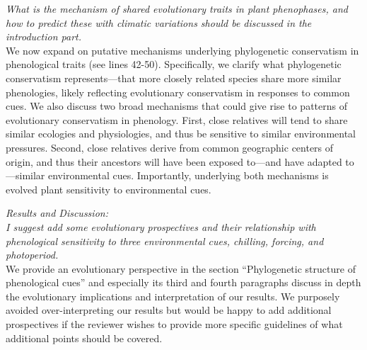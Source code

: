 \documentclass[11pt]{article}
\begin{document}
\emph{What is the mechanism of shared evolutionary traits in plant phenophases, and how to predict these with climatic variations should be discussed in the introduction part.}\\
We now expand on putative mechanisms underlying phylogenetic conservatism in phenological traits (see lines 42-50). Specifically, we clarify what phylogenetic conservatism represents---that more closely related species share more similar phenologies, likely reflecting evolutionary conservatism in responses to common cues. We also discuss two broad mechanisms that could give rise to patterns of evolutionary conservatism in phenology. First, close relatives will tend to share similar ecologies and physiologies, and thus be sensitive to similar environmental pressures. Second, close relatives derive from common geographic centers of origin, and thus their ancestors will have been exposed to---and have adapted to---similar environmental cues. Importantly, underlying both mechanisms is evolved plant sensitivity to environmental cues.


\emph{Results and Discussion:}\\
\emph{I suggest add some evolutionary prospectives and their relationship with phenological sensitivity to three environmental cues, chilling, forcing, and photoperiod.}\\
We provide an evolutionary perspective in the section ``Phylogenetic structure of phenological cues'' and especially its third and fourth paragraphs discuss in depth the evolutionary implications and interpretation of our results. We purposely avoided over-interpreting our results but would be happy to add additional prospectives if the reviewer wishes to provide more specific guidelines of what additional points should be covered.\\
\end{document}
